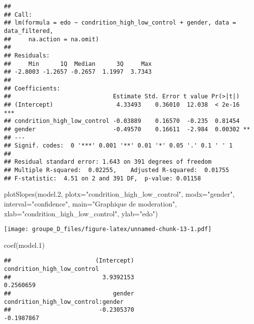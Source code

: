 \documentclass[
]{article}
\newenvironment{Shaded}{\begin{snugshade}}{\end{snugshade}}
\newcommand{\AttributeTok}[1]{\textcolor[rgb]{0.77,0.63,0.00}{#1}}
\newcommand{\FloatTok}[1]{\textcolor[rgb]{0.00,0.00,0.81}{#1}}
\newcommand{\FunctionTok}[1]{\textcolor[rgb]{0.00,0.00,0.00}{#1}}
\newcommand{\NormalTok}[1]{#1}
\newcommand{\StringTok}[1]{\textcolor[rgb]{0.31,0.60,0.02}{#1}}
\begin{document}
\begin{verbatim}
## 
## Call:
## lm(formula = edo ~ condrition_high_low_control + gender, data = data_filtered, 
##     na.action = na.omit)
## 
## Residuals:
##     Min      1Q  Median      3Q     Max 
## -2.8003 -1.2657 -0.2657  1.1997  3.7343 
## 
## Coefficients:
##                             Estimate Std. Error t value Pr(>|t|)    
## (Intercept)                  4.33493    0.36010  12.038  < 2e-16 ***
## condrition_high_low_control -0.03889    0.16570  -0.235  0.81454    
## gender                      -0.49570    0.16611  -2.984  0.00302 ** 
## ---
## Signif. codes:  0 '***' 0.001 '**' 0.01 '*' 0.05 '.' 0.1 ' ' 1
## 
## Residual standard error: 1.643 on 391 degrees of freedom
## Multiple R-squared:  0.02255,    Adjusted R-squared:  0.01755 
## F-statistic:  4.51 on 2 and 391 DF,  p-value: 0.01158
\end{verbatim}

\begin{Shaded}
\begin{Highlighting}[]
\FunctionTok{plotSlopes}\NormalTok{(model}\FloatTok{.2}\NormalTok{, }\AttributeTok{plotx=}\StringTok{"condrition\_high\_low\_control"}\NormalTok{, }\AttributeTok{modx=}\StringTok{"gender"}\NormalTok{,}
           \AttributeTok{interval=}\StringTok{"confidence"}\NormalTok{, }\AttributeTok{main=}\StringTok{"Graphique de moderation"}\NormalTok{,}
           \AttributeTok{xlab=}\StringTok{"condrition\_high\_low\_control"}\NormalTok{, }\AttributeTok{ylab=}\StringTok{"edo"}\NormalTok{)}
\end{Highlighting}
\end{Shaded}

\texttt{[image: groupe\_D\_files/figure-latex/unnamed-chunk-13-1.pdf]}

\begin{Shaded}
\begin{Highlighting}[]
\FunctionTok{coef}\NormalTok{(model}\FloatTok{.1}\NormalTok{)}
\end{Highlighting}
\end{Shaded}

\begin{verbatim}
##                        (Intercept)        condrition_high_low_control 
##                          3.9392153                          0.2560659 
##                             gender condrition_high_low_control:gender 
##                         -0.2305370                         -0.1987867
\end{verbatim}
\end{document}
